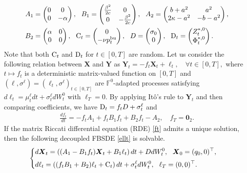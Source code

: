 \documentclass[11pt]{article}
\numberwithin{equation}{section}
\begin{document}
    \begin{align}\label{eq:matrxi0000}
    	A_1&=\begin{pmatrix}
    	0& 0\\
    	0&-\alpha
    \end{pmatrix},~~ B_1=\begin{pmatrix}
    	\frac{\beta^2}{2c}&0\\
    	0&-\frac{\beta^2}{2c}
    \end{pmatrix},~~ A_2=\begin{pmatrix}
    b+a^2&a^2\\
    2\kappa-a^2&-b-a^2
\end{pmatrix},\nonumber\\ 
B_2&=\begin{pmatrix}
\alpha &0\\
0&0
\end{pmatrix},~~ 
{\rm C}_t=\begin{pmatrix}
0\\-\nu p_t^{{\rm bu}}
\end{pmatrix},~~ D=\begin{pmatrix}
    	\sigma_0\\
    	0
    \end{pmatrix},~~ {\rm D}_t=\begin{pmatrix}
    	Z_t^{*,0}\\
    	\Phi_t^{*,0}
    \end{pmatrix}.
\end{align}
Note that both ${\rm C}_t$ and ${\rm D}_t$ for $t\in[0,T]$ are random. Let us consider the following relation between $\boldsymbol{X}$ and $\boldsymbol{Y}$ as $\boldsymbol{Y}_t=-f_t\boldsymbol{X}_t+\ell_t,\quad\forall t\in[0,T], $
where $t\mapsto f_t$ is a deterministic matrix-valued function on $[0,T]$ and $(\ell, \sigma^{\ell})=(\ell_t, \sigma^{\ell})_{t\in [0,T]}$ are $\mathbb{F}^0$-adapted processes satisfying $d\ell_t=\mu_t^{\ell}dt+\sigma_t^{\ell}dW_t^0$ with $\ell_T=0$.  By applying It\^o's rule to $\boldsymbol{Y}_t$ and then comparing coefficients, we have  ${\rm D}_t=f_tD+\sigma_t^{\ell}$ and
\begin{align}\label{ft}
\frac{df_t}{dt}=-f_tA_1+f_tB_1f_t+B_2f_t-A_2,\quad f_T=\boldsymbol{0}_2.
\end{align}
    If the matrix Riccati differential equation (RDE) \eqref{ft} admits a unique solution,  then the following decoupled FBSDE \eqref{ellt} is solvable.  
    \begin{align}\label{ellt}
    \begin{cases}
        \displaystyle d\boldsymbol{X}_t=\left((A_1-B_1f_t)\boldsymbol{X}_t+B_1\ell_t\right)dt+DdW_t^0,~~\boldsymbol{X}_0=(q_0,0)^{\top},\\[0.4em]
    	\displaystyle d\ell_t=\left((f_tB_1+B_2)\ell_t+{\rm C}_t\right)dt+\sigma_t^{\ell}dW_t^0,~~ \ell_T=(0,0)^{\top}.
    \end{cases}
    \end{align}
\end{document}
